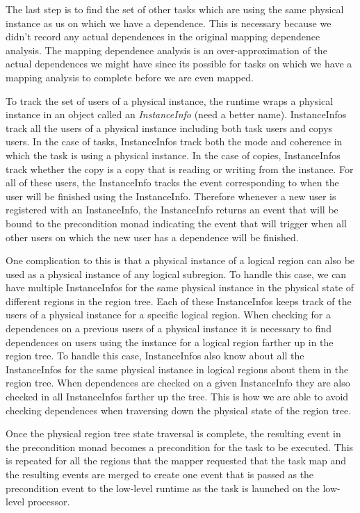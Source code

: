 The last step is to find the set of other tasks which are using the same physical instance as us on which we have
a dependence.  This is necessary because we didn't record any actual dependences in the original mapping dependence
analysis.  The mapping dependence analysis is an over-approximation of the actual dependences we might have since its
possible for tasks on which we have a mapping analysis to complete before we are even mapped.

To track the set of users of a physical instance, the runtime wraps a physical instance in an object called an
{\em InstanceInfo} (need a better name).  InstanceInfos track all the users of a physical instance including both
task users and copys users.  In the case of tasks, InstanceInfos track both the mode and coherence in which the
task is using a physical instance.  In the case of copies, InstanceInfos track whether the copy is a copy that
is reading or writing from the instance.  For all of these users, the InstanceInfo tracks the event corresponding
to when the user will be finished using the InstanceInfo.  Therefore whenever a new user is registered with an
InstanceInfo, the InstanceInfo returns an event that will be bound to the precondition monad indicating the event
that will trigger when all other users on which the new user has a dependence will be finished.

One complication to this is that a physical instance of a logical region can also be used as a physical instance
of any logical subregion.  To handle this case, we can have multiple InstanceInfos for the same physical
instance in the physical state of different regions in the region tree.  Each of these InstanceInfos keeps track
of the users of a physical instance for a specific logical region.  When checking for a dependences on a previous
users of a physical instance it is necessary to find dependences on users using the instance for a logical
region farther up in the region tree.  To handle this case, InstanceInfos also know about all the InstanceInfos
for the same physical instance in logical regions about them in the region tree.  When dependences are checked
on a given InstanceInfo they are also checked in all InstanceInfos farther up the tree.  This is how we are
able to avoid checking dependences when traversing down the physical state of the region tree.

Once the physical region tree state traversal is complete, the resulting event in the precondition monad
becomes a precondition for the task to be executed.  This is repeated for all the regions that the mapper
requested that the task map and the resulting events are merged to create one event that is passed as the
precondition event to the low-level runtime as the task is launched on the low-level processor.


